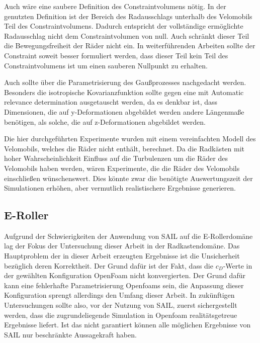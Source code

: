 Auch wäre eine saubere Definition des Constraintvolumens nötig.
In der genutzten Definition ist der Bereich des Radausschlags unterhalb des Velomobils Teil des Constraintvolumens.
Dadurch entspricht der vollständige ermöglichte Radausschlag nicht dem Constraintvolumen von null.
Auch schränkt dieser Teil die Bewegungsfreiheit der Räder nicht ein.
In weiterführenden Arbeiten sollte der Constraint soweit besser formuliert werden, dass dieser Teil kein Teil des Constraintvolumens ist um einen sauberen Nullpunkt zu erhalten.

Auch sollte über die Parametrisierung des Gaußprozesses nachgedacht werden.
Besonders die isotropische Kovarianzfunktion sollte gegen eine mit Automatic relevance determination ausgetauscht werden, da es denkbar ist, dass Dimensionen, die auf y-Deformationen abgebildet werden andere Längenmaße benötigen, als solche, die auf z-Deformationen abgebildet werden.

Die hier durchgeführten Experimente wurden mit einem vereinfachten Modell des Velomobils, welches die Räder nicht enthält, berechnet.
Da die Radkästen mit hoher Wahrscheinlichkeit Einfluss auf die Turbulenzen um die Räder des Velomobils haben werden, wären Experimente, die die Räder des Velomobils einschließen wünschenswert.
Dies könnte zwar die benötigte Auswertungszeit der Simulationen erhöhen, aber vermutlich realistischere Ergebnisse generieren.

\subsection{E-Roller}

Aufgrund der Schwierigkeiten der Anwendung von SAIL auf die E-Rollerdomäne lag der Fokus der Untersuchung dieser Arbeit in der Radkastendomäne.
Das Hauptproblem der in dieser Arbeit erzeugten Ergebnisse ist die Unsicherheit bezüglich deren Korrektheit.
Der Grund dafür ist der Fakt, dass die $c_D$-Werte in der gewählten Konfiguration OpenFoam nicht konvergierten.
Der Grund dafür kann eine fehlerhafte Parametrisierung Openfoams sein, die Anpassung dieser Konfiguration sprengt allerdings den Umfang dieser Arbeit.
In zukünftigen Untersuchungen sollte also, vor der Nutzung von SAIL, zuerst sichergestellt werden, dass die zugrundeliegende Simulation in Openfoam realitätsgetreue Ergebnisse liefert.
Ist das nicht garantiert können alle möglichen Ergebnisse von SAIL nur beschränkte Aussagekraft haben.

